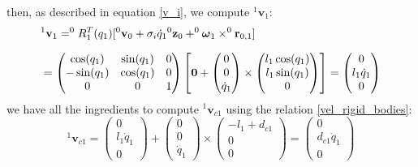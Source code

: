 \documentclass[10pt, a4paper]{report}
\begin{document}
then, as described in equation \eqref{v_i}, we compute ${}^1\mathbf v_1$:\begin{align}
    &{}^1\mathbf v_1=^{0}R^T_1(q_1)[
         {}^{0}\mathbf v_{0}+\sigma_i\dot q_1 {}^{0}\mathbf z_{0}+
         ^{0}{\boldsymbol{\omega}}_{1}\times ^{0}\mathbf r_{0,1}
    ]\\[1.5ex]
    &=
    \begin{pmatrix}
        \cos(q_1)&\sin(q_1)&0\\ 
        -\sin(q_1)&\cos(q_1)&0\\ 
        0&0&1
    \end{pmatrix}\left[
       \mathbf 0+
        \begin{pmatrix}
            0\\0\\\dot q_1
        \end{pmatrix}\times \begin{pmatrix}
            l_1\cos(q_1)\\l_1\sin(q_1)\\ 0
        \end{pmatrix}
    \right]=\begin{pmatrix}
           0\\l_1\dot q_1\\ 0
        \end{pmatrix}
\end{align}
we have all the ingredients to compute ${}^1\mathbf v_{c1}$ using the relation \eqref{vel_rigid_bodies}:\begin{equation}
    {}^1\mathbf v_{c1}=\begin{pmatrix}
           0\\l_1\dot q_1\\ 0
        \end{pmatrix}+\begin{pmatrix}
            0\\0\\\dot q_1
        \end{pmatrix}\times \begin{pmatrix}
        -l_1+d_{c1}\\ 0\\ 0
    \end{pmatrix}=\begin{pmatrix}
        0\\ d_{c1}\dot q_1\\ 0
    \end{pmatrix}
\end{equation}
\end{document}
